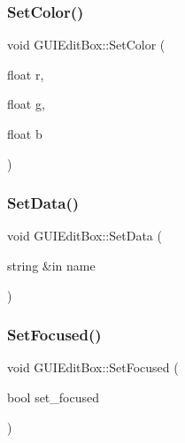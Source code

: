 \hypertarget{class_g_u_i_edit_box_a5f3dda8a65878491098353c493089c94}{}\label{class_g_u_i_edit_box_a5f3dda8a65878491098353c493089c94} 
\subsubsection{\texorpdfstring{Set\+Color()}{SetColor()}}
{\footnotesize\ttfamily void G\+U\+I\+Edit\+Box\+::\+Set\+Color (\begin{DoxyParamCaption}\item[{float}]{r,  }\item[{float}]{g,  }\item[{float}]{b }\end{DoxyParamCaption})}

\hypertarget{class_g_u_i_edit_box_a919189b0306c7bc94bd6cf648d7936a9}{}\label{class_g_u_i_edit_box_a919189b0306c7bc94bd6cf648d7936a9} 
\subsubsection{\texorpdfstring{Set\+Data()}{SetData()}}
{\footnotesize\ttfamily void G\+U\+I\+Edit\+Box\+::\+Set\+Data (\begin{DoxyParamCaption}\item[{string \&in}]{name }\end{DoxyParamCaption})}

\hypertarget{class_g_u_i_edit_box_a7e269748d9dc59e06f24fd0e9065df5a}{}\label{class_g_u_i_edit_box_a7e269748d9dc59e06f24fd0e9065df5a} 
\subsubsection{\texorpdfstring{Set\+Focused()}{SetFocused()}}
{\footnotesize\ttfamily void G\+U\+I\+Edit\+Box\+::\+Set\+Focused (\begin{DoxyParamCaption}\item[{bool}]{set\+\_\+focused }\end{DoxyParamCaption})}

\hypertarget{class_g_u_i_edit_box_a4a93751c5be2da3058db9d95be56adfc}{}\label{class_g_u_i_edit_box_a4a93751c5be2da3058db9d95be56adfc} 
